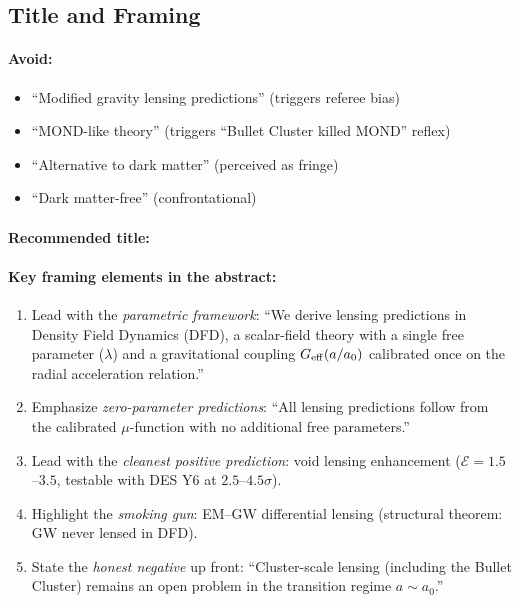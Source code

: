 \documentclass[11pt,a4paper]{article}
\newcommand{\Geff}{G_{\rm eff}}
\begin{document}
\subsection{Title and Framing}

\paragraph{Avoid:}
\begin{itemize}
\item ``Modified gravity lensing predictions'' (triggers referee bias)
\item ``MOND-like theory'' (triggers ``Bullet Cluster killed MOND'' reflex)
\item ``Alternative to dark matter'' (perceived as fringe)
\item ``Dark matter-free'' (confrontational)
\end{itemize}

\paragraph{Recommended title:}
\begin{center}
\end{center}

\paragraph{Key framing elements in the abstract:}
\begin{enumerate}
\item Lead with the \emph{parametric framework}: ``We derive lensing
  predictions in Density Field Dynamics (DFD), a scalar-field theory
  with a single free parameter ($\lambda$) and a gravitational coupling
  $\Geff(a/a_0)$ calibrated once on the radial acceleration relation.''
\item Emphasize \emph{zero-parameter predictions}: ``All lensing
  predictions follow from the calibrated $\mu$-function with no
  additional free parameters.''
\item Lead with the \emph{cleanest positive prediction}: void lensing
  enhancement ($\mathcal{E} = 1.5$--$3.5$, testable with DES Y6 at
  $2.5$--$4.5\sigma$).
\item Highlight the \emph{smoking gun}: EM--GW differential lensing
  (structural theorem: GW never lensed in DFD).
\item State the \emph{honest negative} up front: ``Cluster-scale lensing
  (including the Bullet Cluster) remains an open problem in the
  transition regime $a \sim a_0$.''
\end{enumerate}
\end{document}
